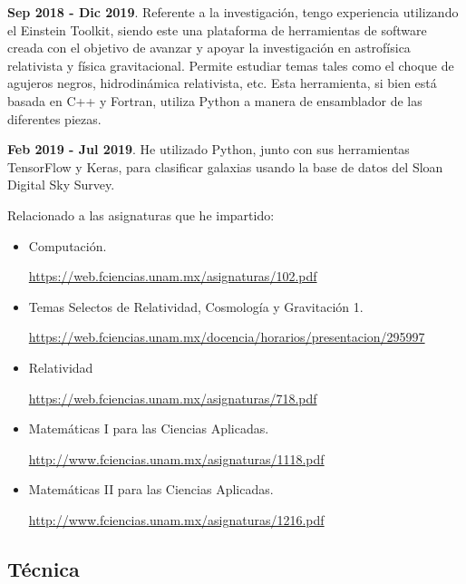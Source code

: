 \documentclass[a4paper,10pt]{article} %
\begin{document}
\textbf{Sep 2018 - Dic 2019}. Referente a la investigación, tengo experiencia utilizando el Einstein Toolkit, siendo este una plataforma de herramientas de software creada con el objetivo de avanzar y apoyar la investigación en astrofísica relativista y física gravitacional. Permite estudiar temas tales como el choque de agujeros negros, hidrodinámica relativista, etc. Esta herramienta, si bien está basada en C++ y Fortran, utiliza Python a manera de ensamblador de las diferentes piezas. 

\textbf{Feb 2019 - Jul 2019}. He utilizado Python, junto con sus herramientas TensorFlow y Keras, para clasificar galaxias usando la base de datos del Sloan Digital Sky Survey.

Relacionado a las asignaturas que he impartido:
\begin{itemize}
	\item Computación.
	
	\href{https://web.fciencias.unam.mx/asignaturas/102.pdf}{https://web.fciencias.unam.mx/asignaturas/102.pdf}

	\item Temas Selectos de Relatividad, Cosmología y Gravitación 1.
	
	\href{https://web.fciencias.unam.mx/docencia/horarios/presentacion/295997}{https://web.fciencias.unam.mx/docencia/horarios/presentacion/295997}
	
	\item Relatividad
	
	\href{https://web.fciencias.unam.mx/asignaturas/718.pdf}{https://web.fciencias.unam.mx/asignaturas/718.pdf}
	
	\item Matemáticas I para las Ciencias Aplicadas. 
	
	\href{http://www.fciencias.unam.mx/asignaturas/1118.pdf}{http://www.fciencias.unam.mx/asignaturas/1118.pdf}
	
	\item Matemáticas II para las Ciencias Aplicadas.
	
	\href{http://www.fciencias.unam.mx/asignaturas/1216.pdf}{http://www.fciencias.unam.mx/asignaturas/1216.pdf}
	

	
\end{itemize}

\subsection*{Técnica}
\end{document}
